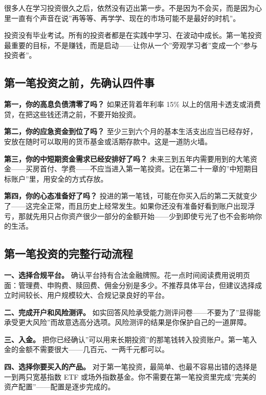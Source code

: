 \documentclass[a4paper,11pt,oneside,fontset=none,UTF8,zihao=-4]{ctexbook}
\begin{document}
很多人在学习投资很久之后，依然没有迈出第一步。不是因为不会买，而是因为心里一直有个声音在说''再等等、再学学、现在的市场可能不是最好的时机''。

投资没有毕业考试。所有的投资者都是在实践中学习、在波动中成长。第一笔投资最重要的目标，不是赚钱，而是启动------让你从一个''旁观学习者''变成一个''参与投资者''。

\subsection{第一笔投资之前，先确认四件事}\label{ux7b2cux4e00ux7b14ux6295ux8d44ux4e4bux524dux5148ux786eux8ba4ux56dbux4ef6ux4e8b}

\textbf{第一，你的高息负债清零了吗？} 如果还背着年利率 15\%
以上的信用卡透支或消费贷，在把这些钱还清之前，不要开始投资。

\textbf{第二，你的应急资金到位了吗？}
至少三到六个月的基本生活支出应当已经存好，安放在随时可以取用的货币基金或活期存款中。这是一道防火墙。

\textbf{第三，你的中短期资金需求已经安排好了吗？}
未来三到五年内需要用到的大笔资金------买房首付、学费------不应当进入第一笔投资。记在第二十一章的''中短期目标账户''里，用安全的方式存放。

\textbf{第四，你的心态准备好了吗？}
投进的第一笔钱，可能在你买入后的第二天就变少了------这完全正常，而且历史上经常发生。如果你还没有准备好看到账户出现浮亏，那就先用只占你资产很少一部分的金额开始------少到即使亏光了也不会影响你的生活。

\subsection{第一笔投资的完整行动流程}\label{ux7b2cux4e00ux7b14ux6295ux8d44ux7684ux5b8cux6574ux884cux52a8ux6d41ux7a0b}

\textbf{一、选择合规平台。}
确认平台持有合法金融牌照。花一点时间阅读费用说明页面：管理费、申购费、赎回费、佣金分别是多少。不推荐具体平台，但建议选择成立时间较长、用户规模较大、合规记录良好的平台。

\textbf{二、完成开户和风险测评。}
如实回答风险承受能力测评问卷------不要为了''显得能承受更大风险''而故意选高分选项。风险测评的结果是你保护自己的一道屏障。

\textbf{三、入金。}
把你已经确认''可以用来长期投资''的那笔钱转入投资账户。第一笔入金的金额不需要很大------几百元、一两千元都可以。

\textbf{四、选择你要买入的产品。}
对于第一笔投资，最简单、也最不容易出错的选择是一到两只宽基指数 ETF
或场外指数基金。你不需要在第一笔投资里完成''完美的资产配置''------配置是逐步完成的。
\end{document}
